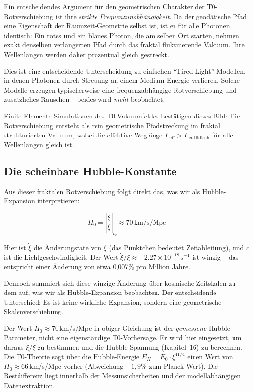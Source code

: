 Ein entscheidendes Argument für den geometrischen Charakter der T0-Rotverschiebung ist ihre \textit{strikte Frequenzunabhängigkeit}. Da der geodätische Pfad eine Eigenschaft der Raumzeit-Geometrie selbst ist, ist er für alle Photonen identisch: Ein rotes und ein blaues Photon, die am selben Ort starten, nehmen exakt denselben verlängerten Pfad durch das fraktal fluktuierende Vakuum. Ihre Wellenlängen werden daher prozentual gleich gestreckt.

Dies ist eine entscheidende Unterscheidung zu einfachen \enquote{Tired Light}-Modellen, in denen Photonen durch Streuung an einem Medium Energie verlieren. Solche Modelle erzeugen typischerweise eine frequenzabhängige Rotverschiebung und zusätzliches Rauschen -- beides wird \textit{nicht} beobachtet.

Finite-Elemente-Simulationen des T0-Vakuumfeldes bestätigen dieses Bild: Die Rotverschiebung entsteht als rein geometrische Pfadstreckung im fraktal strukturierten Vakuum, wobei die effektive Weglänge $L_{\text{eff}} > L_{\text{euklidisch}}$ für alle Wellenlängen gleich ist.

\subsection{Die scheinbare Hubble-Konstante}

Aus dieser fraktalen Rotverschiebung folgt direkt das, was wir als Hubble-Expansion interpretieren:

\begin{equation}
H_0 = \left|\frac{\dot{\xi}}{\xi}\right|_{t_0} \approx 70 \, \text{km/s/Mpc}
\end{equation}

Hier ist $\dot{\xi}$ die Änderungsrate von $\xi$ (das Pünktchen bedeutet Zeitableitung), und $c$ ist die Lichtgeschwindigkeit. Der Wert $\dot{\xi}/\xi \approx -2.27 \times 10^{-18} \, \text{s}^{-1}$ ist winzig -- das entspricht einer Änderung von etwa 0{,}007\% pro Million Jahre.

Dennoch summiert sich diese winzige Änderung über kosmische Zeitskalen zu dem auf, was wir als Hubble-Expansion beobachten. Der entscheidende Unterschied: Es ist keine wirkliche Expansion, sondern eine geometrische Skalenverschiebung.

\begin{remark}
Der Wert $H_0 \approx 70\,$km/s/Mpc in obiger Gleichung ist der \emph{gemessene} Hubble-Parameter, nicht eine eigenständige T0-Vorhersage. Er wird hier eingesetzt, um daraus $\dot{\xi}/\xi$ zu bestimmen und die Hubble-Spannung (Kapitel~16) zu berechnen. Die T0-Theorie sagt über die Hubble-Energie $E_H = E_0 \cdot \xi^{41/4}$ einen Wert von $H_0 \approx 66\,$km/s/Mpc vorher (Abweichung $-1{,}9\%$ zum Planck-Wert). Die Restdifferenz liegt innerhalb der Messunsicherheiten und der modellabhängigen Datenextraktion.
\end{remark}

